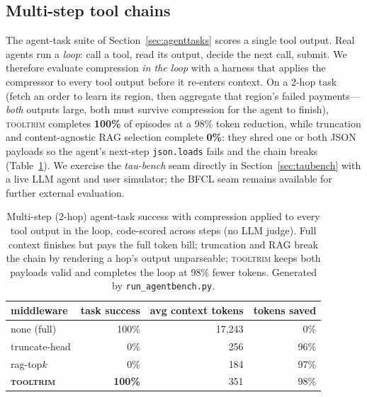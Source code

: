 \documentclass[11pt]{article}
\newcommand{\tooltrim}{\textsc{tooltrim}}
\begin{document}
\subsection{Multi-step tool chains}
\label{sec:multistep}
The agent-task suite of Section~\ref{sec:agenttasks} scores a single tool output.
Real agents run a \emph{loop}: call a tool, read its output, decide the next call,
submit. We therefore evaluate compression \emph{in the loop} with a harness that
applies the compressor to every tool output before it re-enters context. On a
2-hop task (fetch an order to learn its region, then aggregate that region's
failed payments---\emph{both} outputs large, both must survive compression for the
agent to finish), \tooltrim{} completes \textbf{100\%} of episodes at a 98\% token
reduction, while truncation and content-agnostic RAG selection complete
\textbf{0\%}: they shred one or both JSON payloads so the agent's next-step
\texttt{json.loads} fails and the chain breaks (Table~\ref{tab:multistep}). We
exercise the \emph{tau-bench} seam directly in Section~\ref{sec:taubench} with a
live LLM agent and user simulator; the BFCL seam remains available for further
external evaluation.

\begin{table}[t]
\centering
\begin{tabular}{lrrr}
\toprule
middleware & task success & avg context tokens & tokens saved \\
\midrule
none (full)    & 100\% & 17{,}243 & 0\%  \\
truncate-head  & 0\%   & 256      & 96\% \\
rag-top$k$     & 0\%   & 184      & 97\% \\
\textbf{\tooltrim} & \textbf{100\%} & 351 & 98\% \\
\bottomrule
\end{tabular}
\caption{Multi-step (2-hop) agent-task success with compression applied to every
tool output in the loop, code-scored across steps (no LLM judge). Full context
finishes but pays the full token bill; truncation and RAG break the chain by
rendering a hop's output unparseable; \tooltrim{} keeps both payloads valid and
completes the loop at 98\% fewer tokens. Generated by \texttt{run\_agentbench.py}.}
\label{tab:multistep}
\end{table}
\end{document}
